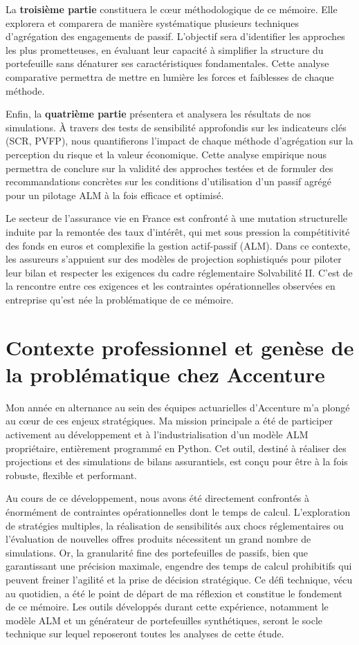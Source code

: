 La \textbf{troisième partie} constituera le cœur méthodologique de ce mémoire. Elle explorera et comparera de manière systématique plusieurs techniques d'agrégation des engagements de passif. L'objectif sera d'identifier les approches les plus prometteuses, en évaluant leur capacité à simplifier la structure du portefeuille sans dénaturer ses caractéristiques fondamentales. Cette analyse comparative permettra de mettre en lumière les forces et faiblesses de chaque méthode.


Enfin, la \textbf{quatrième partie} présentera et analysera les résultats de nos simulations. À travers des tests de sensibilité approfondis sur les indicateurs clés (SCR, PVFP), nous quantifierons l'impact de chaque méthode d'agrégation sur la perception du risque et la valeur économique. Cette analyse empirique nous permettra de conclure sur la validité des approches testées et de formuler des recommandations concrètes sur les conditions d'utilisation d'un passif agrégé pour un pilotage ALM à la fois efficace et optimisé.

Le secteur de l'assurance vie en France est confronté à une mutation structurelle induite par la remontée des taux d'intérêt, qui met sous pression la compétitivité des fonds en euros et complexifie la gestion actif-passif (ALM). Dans ce contexte, les assureurs s'appuient sur des modèles de projection sophistiqués pour piloter leur bilan et respecter les exigences du cadre réglementaire Solvabilité II. C'est de la rencontre entre ces exigences et les contraintes opérationnelles observées en entreprise qu'est née la problématique de ce mémoire.

\section{Contexte professionnel et genèse de la problématique chez Accenture}

Mon année en alternance au sein des équipes actuarielles d'Accenture m'a plongé au cœur de ces enjeux stratégiques. Ma mission principale a été de participer activement au développement et à l'industrialisation d'un modèle ALM propriétaire, entièrement programmé en Python. Cet outil, destiné à réaliser des projections et des simulations de bilans assurantiels, est conçu pour être à la fois robuste, flexible et performant.

Au cours de ce développement, nous avons été directement confrontés à énormément de contraintes opérationnelles dont le temps de calcul. L'exploration de stratégies multiples, la réalisation de sensibilités aux chocs réglementaires ou l'évaluation de nouvelles offres produits nécessitent un grand nombre de simulations. Or, la granularité fine des portefeuilles de passifs, bien que garantissant une précision maximale, engendre des temps de calcul prohibitifs qui peuvent freiner l'agilité et la prise de décision stratégique. Ce défi technique, vécu au quotidien, a été le point de départ de ma réflexion et constitue le fondement de ce mémoire. Les outils développés durant cette expérience, notamment le modèle ALM et un générateur de portefeuilles synthétiques, seront le socle technique sur lequel reposeront toutes les analyses de cette étude.

